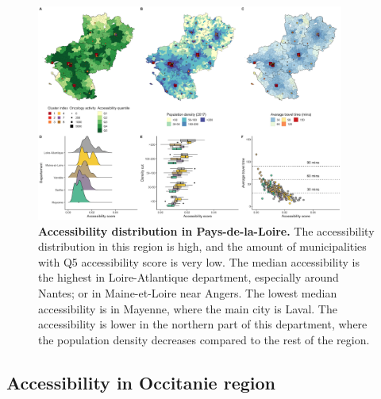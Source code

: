 \begin{figure}[h!]
    \includegraphics[width=0.9\textwidth]{images/camion/region_accessibility/accessibility_Pays-de-la-Loire.png}
    \centering
    \caption{
        \textbf{Accessibility distribution in Pays-de-la-Loire.} The accessibility distribution
        in this region is high, and the amount of municipalities with Q5 accessibility
        score is very low. The median accessibility is the highest in Loire-Atlantique
        department, especially around Nantes; or in Maine-et-Loire near Angers. The
        lowest median accessibility is in Mayenne, where the main city is Laval. The
        accessibility is lower in the northern part of this department, where the
        population density decreases compared to the rest of the region.
    }
\end{figure}

\subsection*{Accessibility in Occitanie region}


